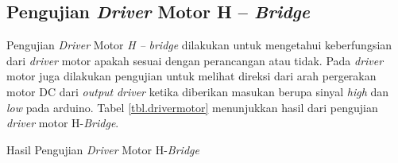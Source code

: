 \subsection{Pengujian \textit{Driver} Motor H – \textit{Bridge}}
Pengujian \textit{Driver} Motor\textit{ H –} \textit{bridge} dilakukan untuk mengetahui keberfungsian dari \textit{driver} motor apakah sesuai dengan perancangan atau tidak. Pada \textit{driver} motor juga dilakukan pengujian untuk melihat direksi dari arah pergerakan motor DC dari \textit{output} \textit{driver} ketika diberikan masukan berupa sinyal \textit{high} dan \textit{low} pada arduino. Tabel \ref{tbl.drivermotor} menunjukkan hasil dari pengujian \textit{driver} motor H-\textit{Bridge}. 
\begin{table}[H]
	\centering
	\caption{Hasil Pengujian \textit{Driver} Motor H-\textit{Bridge}}
		\label{tbl.drivermotor}
		

\end{table}
